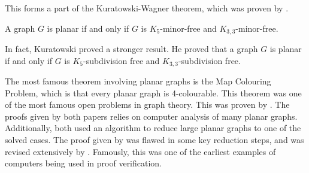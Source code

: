 This forms a part of the Kuratowski-Wagner theorem, which was proven by \Textcite{kuratowskiProblemeCourbesGauches1930,wagnerUeberEigenschaftEbenen1937}. 
\begin{theorem}
	A graph $G$ is planar if and only if $G$ is $K_5$-minor-free and $K_{3,3}$-minor-free. 
\end{theorem}
In fact, Kuratowski proved a stronger result. He proved that a graph $G$ is planar if and only if $G$ is $K_5$-subdivision free and $K_{3,3}$-subdivision free. 

The most famous theorem involving planar graphs is the Map Colouring Problem,  which is that every planar graph is 4-colourable. 
This theorem was one of the most famous open problems in graph theory.
This was proven by \textcite{appelEveryPlanarMap1989,robertsonEfficientlyFourcoloringPlanar1996}. The proofs given by both papers relies on computer analysis of many planar graphs. Additionally, both used an algorithm to reduce large planar graphs to one of the solved cases. The proof given by \textcite{appelEveryPlanarMap1989} was flawed in some key reduction steps, and was revised extensively by \textcite{robertsonEfficientlyFourcoloringPlanar1996}. Famously, this was one of the earliest examples of computers being used in proof verification.

